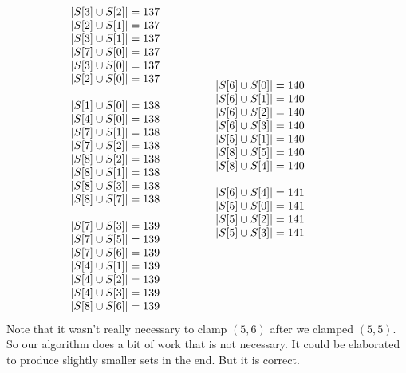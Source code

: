 \documentclass[12pt]{article}
\theoremstyle{definition}
\begin{document}
\[\begin{array}[t]{l@{\qquad\qquad}l@{\qquad\qquad}l}
\begin{array}{l}
|S[3] \cup S[2]| = 137 \\
|S[2] \cup S[1]| = 137 \\
|S[3] \cup S[1]| = 137 \\
|S[7] \cup S[0]| = 137 \\
|S[3] \cup S[0]| = 137 \\
|S[2] \cup S[0]| = 137 \\
  \\
|S[1] \cup S[0]| = 138 \\
|S[4] \cup S[0]| = 138 \\
|S[7] \cup S[1]| = 138 \\
|S[7] \cup S[2]| = 138 \\
|S[8] \cup S[2]| = 138 \\
|S[8] \cup S[1]| = 138 \\
|S[8] \cup S[3]| = 138 \\
|S[8] \cup S[7]| = 138 \\
  \\
|S[7] \cup S[3]| = 139 \\
|S[7] \cup S[5]| = 139 \\
|S[7] \cup S[6]| = 139 \\
|S[4] \cup S[1]| = 139 \\
|S[4] \cup S[2]| = 139 \\
|S[4] \cup S[3]| = 139 \\
|S[8] \cup S[6]| = 139 \\
   \end{array}
 &
  \begin{array}{l}
|S[6] \cup S[0]| = 140 \\
|S[6] \cup S[1]| = 140 \\
|S[6] \cup S[2]| = 140 \\
|S[6] \cup S[3]| = 140 \\
|S[5] \cup S[1]| = 140 \\
|S[8] \cup S[5]| = 140 \\
|S[8] \cup S[4]| = 140 \\
  \\
|S[6] \cup S[4]| = 141 \\
|S[5] \cup S[0]| = 141 \\
|S[5] \cup S[2]| = 141 \\
|S[5] \cup S[3]| = 141 \\
\end{array}
\end{array}
\]
Note that it wasn't really necessary to clamp $(5,6)$ after we clamped $(5,5)$.
So our algorithm does a bit of work that is not necessary.   It could be elaborated to 
produce slightly smaller sets in the end.  But it is correct.
\end{document}
